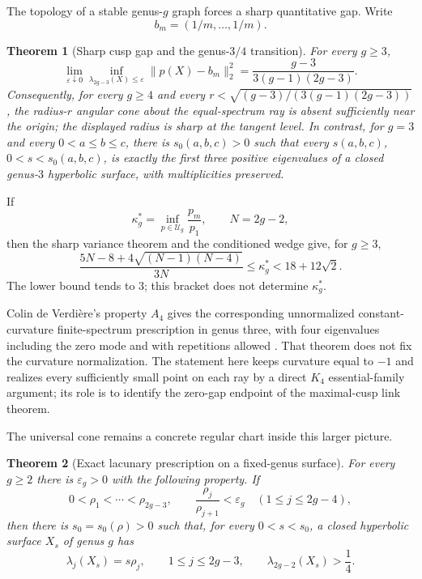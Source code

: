 \documentclass[11pt,reqno]{amsart}
\newtheorem{theorem}{Theorem}[section]
\theoremstyle{definition}
\theoremstyle{remark}
\begin{document}
The topology of a stable genus-$g$ graph forces a sharp quantitative gap.
Write
\[
 b_m=(1/m,\ldots,1/m).
\]

\begin{theorem}[Sharp cusp gap and the genus-$3/4$ transition]
\label{thm:intro-cusp-gap}
For every $g\ge3$,
\[
 \lim_{\varepsilon\downarrow0}
 \inf_{\lambda_{2g-3}(X)\le\varepsilon}
 \|p(X)-b_m\|_2^2
 =\frac{g-3}{3(g-1)(2g-3)}.
\]
Consequently, for every $g\ge4$ and every
$r<\sqrt{(g-3)/(3(g-1)(2g-3))}$, the radius-$r$ angular cone about the
equal-spectrum ray is absent sufficiently near the origin; the displayed
radius is sharp at the tangent level.  In contrast, for $g=3$ and every
$0<a\le b\le c$, there is $s_0(a,b,c)>0$ such that every $s(a,b,c)$,
$0<s<s_0(a,b,c)$, is exactly the first three positive eigenvalues of a
closed genus-$3$ hyperbolic surface, with multiplicities preserved.
\end{theorem}

If
\[
 \kappa_g^*=\inf_{p\in\mathcal U_g}\frac{p_m}{p_1},
 \qquad N=2g-2,
\]
then the sharp variance theorem and the conditioned wedge give, for $g\ge3$,
\[
 \frac{5N-8+4\sqrt{(N-1)(N-4)}}{3N}
 \le\kappa_g^*<18+12\sqrt2.
\]
The lower bound tends to $3$; this bracket does not determine
$\kappa_g^*$.

Colin de Verdi\`ere's property $A_4$ gives the corresponding unnormalized
constant-curvature finite-spectrum prescription in genus three, with four
eigenvalues including the zero mode and with repetitions allowed
\cite[Theorem~1.3 and \S2a]{CdV1987}.  That theorem does not fix the
curvature normalization.  The statement here keeps curvature equal to $-1$
and realizes every sufficiently small point on each ray by a direct $K_4$
essential-family argument; its role is to identify the zero-gap endpoint of
the maximal-cusp link theorem.

The universal cone remains a concrete regular chart inside this larger
picture.

\begin{theorem}[Exact lacunary prescription on a fixed-genus surface]
\label{thm:intro-surface}
For every $g\ge2$ there is $\varepsilon_g>0$ with the following property.
If
\[
 0<\rho_1<\cdots<\rho_{2g-3},\qquad
 \frac{\rho_j}{\rho_{j+1}}<\varepsilon_g
 \quad(1\le j\le2g-4),
\]
then there is $s_0=s_0(\rho)>0$ such that, for every $0<s<s_0$, a closed
hyperbolic surface $X_s$ of genus $g$ has
\[
  \lambda_j(X_s)=s\rho_j,
  \qquad 1\le j\le2g-3,
 \qquad \lambda_{2g-2}(X_s)>\frac14.
\]
\end{theorem}
\end{document}
